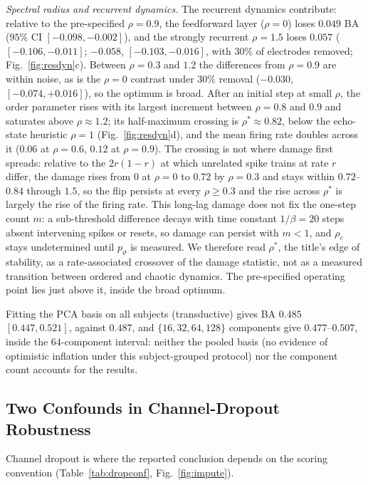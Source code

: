 \documentclass[conference]{IEEEtran}
\begin{document}
\emph{Spectral radius and recurrent dynamics.} The recurrent dynamics contribute: relative to the pre-specified $\rho=0.9$, the feedforward layer ($\rho=0$) loses $0.049$ BA ($95\%$ CI $[-0.098,-0.002]$), and the strongly recurrent $\rho=1.5$ loses $0.057$ ($[-0.106,-0.011]$; $-0.058$, $[-0.103,-0.016]$, with $30\%$ of electrodes removed; Fig.~\ref{fig:resdyn}c). Between $\rho=0.3$ and $1.2$ the differences from $\rho=0.9$ are within noise, as is the $\rho=0$ contrast under $30\%$ removal ($-0.030$, $[-0.074,+0.016]$), so the optimum is broad. After an initial step at small $\rho$, the order parameter rises with its largest increment between $\rho=0.8$ and $0.9$ and saturates above $\rho\approx1.2$; its half-maximum crossing is $\rho^\ast\approx0.82$, below the echo-state heuristic $\rho=1$ (Fig.~\ref{fig:resdyn}d), and the mean firing rate doubles across it ($0.06$ at $\rho=0.6$, $0.12$ at $\rho=0.9$). The crossing is not where damage first spreads: relative to the $2r(1-r)$ at which unrelated spike trains at rate $r$ differ, the damage rises from $0$ at $\rho=0$ to $0.72$ by $\rho=0.3$ and stays within $0.72$--$0.84$ through $1.5$, so the flip persists at every $\rho\ge0.3$ and the rise across $\rho^\ast$ is largely the rise of the firing rate. This long-lag damage does not fix the one-step count $m$: a sub-threshold difference decays with time constant $1/\beta=20$ steps absent intervening spikes or resets, so damage can persist with $m<1$, and $\rho_c$ stays undetermined until $p_\vartheta$ is measured. We therefore read $\rho^\ast$, the title's edge of stability, as a rate-associated crossover of the damage statistic, not as a measured transition between ordered and chaotic dynamics. The pre-specified operating point lies just above it, inside the broad optimum.

Fitting the PCA basis on all subjects (transductive) gives BA $0.485$ $[0.447,0.521]$, against $0.487$, and $\{16,32,64,128\}$ components give $0.477$--$0.507$, inside the $64$-component interval: neither the pooled basis (no evidence of optimistic inflation under this subject-grouped protocol) nor the component count accounts for the results.

\subsection{Two Confounds in Channel-Dropout Robustness}
\label{sec:perturb}
Channel dropout is where the reported conclusion depends on the scoring convention (Table~\ref{tab:dropconf}, Fig.~\ref{fig:impute}).
\end{document}
